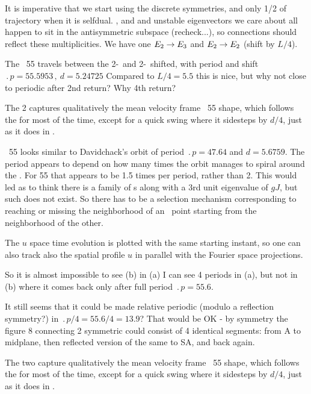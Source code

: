 It is imperative that we start using the discrete symmetries, and only 1/2
of trajectory when it is selfdual. 
,  and  and unstable eigenvectors
we care about all happen to sit in the antisymmetric subspace
(recheck...), so connections should reflect these multiplicities. We have
one $E_{2} \to E_{3}$ and $E_{2} \to E_{2}$ (shift by $L/4$).

The \rpo\ {\nameit}55 travels between the 2-\eqv\  and 
2-\eqv\ shifted,
with period and shift
$\period{p}=55.5953\,,\ d=5.24725$
Compared to $L/4 = 5.5$
this is nice, but why not close to periodic after 2nd return? Why 4th return?

The {\nameit}2 {\eqv}
captures qualitatively the mean velocity frame \rpo\ {\nameit}55 shape,
which follows the
{\eqv} for most of the time, except for a quick swing where it
sidesteps by $d/4$, just as it does in . 

\Rpo\ {\nameit}55 looks similar to Davidchack's  orbit
of period 
$\period{p}=47.64$ and $d=5.6759$. The period appears to depend on how
many times the orbit manages to spiral around the \eqv.
For {\nameit}55 that appears to be
1.5 times per period, rather than 2. This would led as
to
think there is a family of \rpo s along with a 3rd unit eigenvalue of
$gJ$,
but such does not exist.
So there has to be a selection mechanism corresponding to
reaching or missing the neighborhood of an \eqv\  point starting from
the neighborhood of the other. 

The $u$ space time evolution  %
is plotted with the same starting instant,
so one can also track also the spatial profile $u$ in parallel with
the Fourier space projections.

So it is almost impossible to see (b) %
in (a) %
I can see 4 periods in (a), %
but not in (b) %
where it comes back only after full period $\period{p}=55.6$.

It still seems that it could be made relative periodic 
(modulo a reflection symmetry?)
in $\period{p}/4=55.6/4=13.9$? That would be OK 
-
by symmetry the figure 8 connecting
2 symmetric {\eqva} could consist of 4 identical segments: from
{\eqv} A to midplane, then reflected version of the same to SA, and
back again.

The two {\eqva}
capture qualitatively the mean velocity frame \rpo\ {\nameit}55 shape,
which follows the
{\eqv} for most of the time, except for a quick swing where it
sidesteps by $d/4$, just as it does in . 

